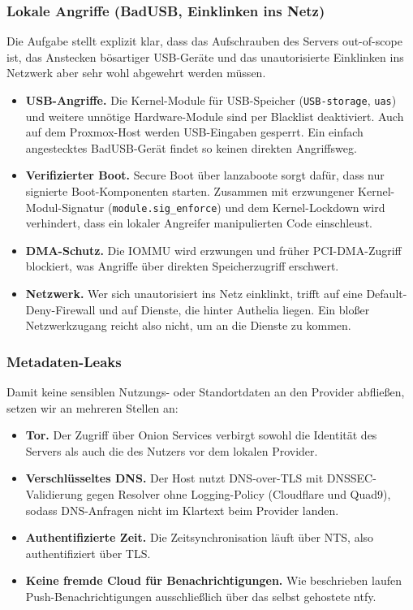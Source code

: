 \subsubsection{Lokale Angriffe (Bad\ac{USB}, Einklinken ins Netz)}

Die Aufgabe stellt explizit klar, dass das Aufschrauben des Servers
out-of-scope ist, das Anstecken bösartiger \ac{USB}-Geräte und das unautorisierte
Einklinken ins Netzwerk aber sehr wohl abgewehrt werden müssen.

\begin{itemize}
  \item \textbf{\ac{USB}-Angriffe.} Die Kernel-Module für \ac{USB}-Speicher
    (\texttt{\ac{USB}-storage}, \texttt{uas}) und weitere unnötige Hardware-Module
    sind per Blacklist deaktiviert. Auch auf dem Proxmox-Host werden \ac{USB}-Eingaben
    gesperrt. Ein einfach angestecktes Bad\ac{USB}-Gerät findet so keinen direkten
    Angriffsweg.
  \item \textbf{Verifizierter Boot.} Secure Boot über lanzaboote sorgt dafür,
    dass nur signierte Boot-Komponenten starten. Zusammen mit erzwungener
    Kernel-Modul-Signatur (\texttt{module.sig\_enforce}) und dem Kernel-Lockdown
    wird verhindert, dass ein lokaler Angreifer manipulierten Code einschleust.
  \item \textbf{\ac{DMA}-Schutz.} Die \ac{IOMMU} wird erzwungen und früher \ac{PCI}-\ac{DMA}-Zugriff
    blockiert, was Angriffe über direkten Speicherzugriff erschwert.
  \item \textbf{Netzwerk.} Wer sich unautorisiert ins Netz einklinkt, trifft auf
    eine Default-Deny-Firewall und auf Dienste, die hinter Authelia liegen. Ein
    bloßer Netzwerkzugang reicht also nicht, um an die Dienste zu kommen.
\end{itemize}

\subsubsection{Metadaten-Leaks}

Damit keine sensiblen Nutzungs- oder Standortdaten an den Provider abfließen,
setzen wir an mehreren Stellen an:

\begin{itemize}
  \item \textbf{Tor.} Der Zugriff über Onion Services verbirgt sowohl die
    Identität des Servers als auch die des Nutzers vor dem lokalen Provider.
  \item \textbf{Verschlüsseltes \ac{DNS}.} Der Host nutzt \ac{DNS}-over-\ac{TLS} mit
    \ac{DNSSEC}-Validierung gegen Resolver ohne Logging-Policy (Cloudflare und Quad9),
    sodass \ac{DNS}-Anfragen nicht im Klartext beim Provider landen.
  \item \textbf{Authentifizierte Zeit.} Die Zeitsynchronisation läuft über \ac{NTS}, also authentifiziert über \ac{TLS}.
  \item \textbf{Keine fremde Cloud für Benachrichtigungen.} Wie beschrieben laufen
    Push-Benachrichtigungen ausschließlich über das selbst gehostete ntfy.
\end{itemize}

